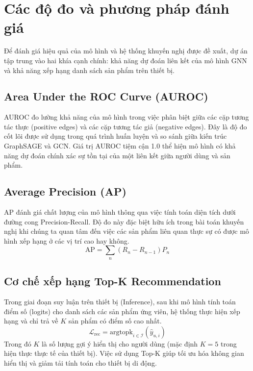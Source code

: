 \section{Các độ đo và phương pháp đánh giá}

Để đánh giá hiệu quả của mô hình và hệ thống khuyến nghị được đề xuất, dự án tập trung vào hai khía cạnh chính: khả năng dự đoán liên kết của mô hình GNN và khả năng xếp hạng danh sách sản phẩm trên thiết bị.

\subsection{Area Under the ROC Curve (AUROC)}
AUROC đo lường khả năng của mô hình trong việc phân biệt giữa các cặp tương tác thực (positive edges) và các cặp tương tác giả (negative edges). Đây là độ đo cốt lõi được sử dụng trong quá trình huấn luyện và so sánh giữa kiến trúc GraphSAGE và GCN. Giá trị AUROC tiệm cận 1.0 thể hiện mô hình có khả năng dự đoán chính xác sự tồn tại của một liên kết giữa người dùng và sản phẩm.

\subsection{Average Precision (AP)}
AP đánh giá chất lượng của mô hình thông qua việc tính toán diện tích dưới đường cong Precision-Recall. Độ đo này đặc biệt hữu ích trong bài toán khuyến nghị khi chúng ta quan tâm đến việc các sản phẩm liên quan thực sự có được mô hình xếp hạng ở các vị trí cao hay không.
\begin{equation}
    \text{AP} = \sum_n (R_n - R_{n-1}) P_n
\end{equation}

\subsection{Cơ chế xếp hạng Top-K Recommendation}
Trong giai đoạn suy luận trên thiết bị (Inference), sau khi mô hình tính toán điểm số (logits) cho danh sách các sản phẩm ứng viên, hệ thống thực hiện xếp hạng và chỉ trả về $K$ sản phẩm có điểm số cao nhất.
\begin{equation}
    \mathcal{L}_{\text{rec}} = \text{argtopk}_{i \in \mathcal{I}} (\hat{y}_{u,i})
\end{equation}
Trong đó $K$ là số lượng gợi ý hiển thị cho người dùng (mặc định $K=5$ trong hiện thực thực tế của thiết bị). Việc sử dụng Top-K giúp tối ưu hóa không gian hiển thị và giảm tải tính toán cho thiết bị di động.

